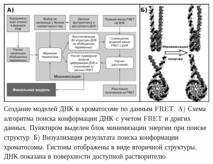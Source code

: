    \begin{figure} [H]
    \centering
    \includegraphics[width=\textwidth]{images/p6/p6_5/p6_5_f2.pdf}
    \caption[Создание моделей ДНК в хроматосоме по данным FRET.]{Создание моделей ДНК в хроматосоме по данным FRET. A) Схема алгоритма поиска конформации ДНК с учетом FRET и дригих данных. Пунктиром выделен блок минимизации энергии при поиске структур. Б) Визуализация результата поиска конформации хроматосомы. Гистоны отображены в виде вторичной структуры, ДНК показана в поверхности доступной растворителю.
}
    \label{fig:p6_5_f2}
\end{figure}


